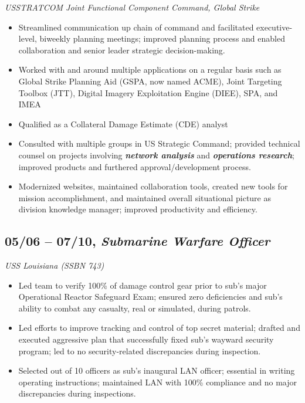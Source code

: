 \documentclass[10pt]{article}
\def\tightlist{}
\begin{document}
\emph{USSTRATCOM Joint Functional Component Command, Global Strike}

\begin{itemize}
\tightlist
\item
  Streamlined communication up chain of command and facilitated
  executive-level, biweekly planning meetings; improved planning process
  and enabled collaboration and senior leader strategic decision-making.
\item
  Worked with and around multiple applications on a regular basis such
  as Global Strike Planning Aid (GSPA, now named ACME), Joint Targeting
  Toolbox (JTT), Digital Imagery Exploitation Engine (DIEE), SPA, and
  IMEA
\item
  Qualified as a Collateral Damage Estimate (CDE) analyst
\item
  Consulted with multiple groups in US Strategic Command; provided
  technical counsel on projects involving \textbf{\emph{network
  analysis}} and \textbf{\emph{operations research}}; improved products
  and furthered approval/development process.
\item
  Modernized websites, maintained collaboration tools, created new tools
  for mission accomplishment, and maintained overall situational picture
  as division knowledge manager; improved productivity and efficiency.
\end{itemize}

\hypertarget{submarine-warfare-officer}{%
\subsection{\texorpdfstring{05/06 -- 07/10, \textbf{\emph{Submarine
Warfare
Officer}}}{05/06 -- 07/10, Submarine Warfare Officer}}\label{submarine-warfare-officer}}

\emph{USS Louisiana (SSBN 743)}

\begin{itemize}
\tightlist
\item
  Led team to verify 100\% of damage control gear prior to sub's major
  Operational Reactor Safeguard Exam; ensured zero deficiencies and
  sub's ability to combat any casualty, real or simulated, during
  patrols.
\item
  Led efforts to improve tracking and control of top secret material;
  drafted and executed aggressive plan that successfully fixed sub's
  wayward security program; led to no security-related discrepancies
  during inspection.
\item
  Selected out of 10 officers as sub's inaugural LAN officer; essential
  in writing operating instructions; maintained LAN with 100\%
  compliance and no major discrepancies during inspections.
\end{itemize}
\end{document}
